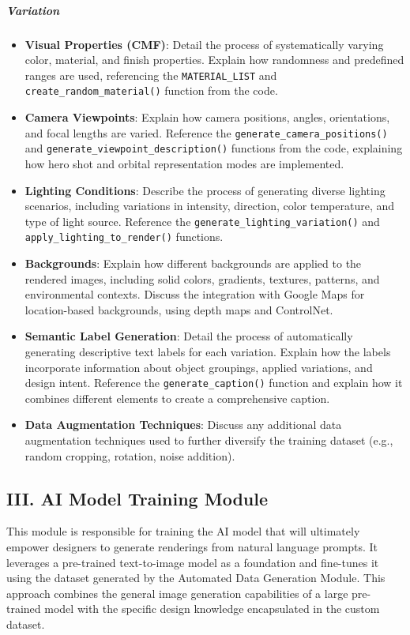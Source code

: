 \subparagraph{Variation}
\begin{itemize}
    \item \textbf{Visual Properties (CMF)}: Detail the process of systematically varying color, material, and finish properties. Explain how randomness and predefined ranges are used, referencing the \texttt{MATERIAL\_LIST} and \texttt{create\_random\_material()} function from the code.
    \item \textbf{Camera Viewpoints}: Explain how camera positions, angles, orientations, and focal lengths are varied. Reference the \texttt{generate\_camera\_positions()} and \texttt{generate\_viewpoint\_description()} functions from the code, explaining how hero shot and orbital representation modes are implemented.
    \item \textbf{Lighting Conditions}: Describe the process of generating diverse lighting scenarios, including variations in intensity, direction, color temperature, and type of light source. Reference the \texttt{generate\_lighting\_variation()} and \texttt{apply\_lighting\_to\_render()} functions.
    \item \textbf{Backgrounds}: Explain how different backgrounds are applied to the rendered images, including solid colors, gradients, textures, patterns, and environmental contexts. Discuss the integration with Google Maps for location-based backgrounds, using depth maps and ControlNet.
    \item \textbf{Semantic Label Generation}: Detail the process of automatically generating descriptive text labels for each variation. Explain how the labels incorporate information about object groupings, applied variations, and design intent. Reference the \texttt{generate\_caption()} function and explain how it combines different elements to create a comprehensive caption.
    \item \textbf{Data Augmentation Techniques}: Discuss any additional data augmentation techniques used to further diversify the training dataset (e.g., random cropping, rotation, noise addition).
\end{itemize}

\subsection{III. AI Model Training Module}

\patentParagraph
This module is responsible for training the AI model that will ultimately empower designers to generate renderings from natural language prompts. It leverages a pre-trained text-to-image model as a foundation and fine-tunes it using the dataset generated by the Automated Data Generation Module. This approach combines the general image generation capabilities of a large pre-trained model with the specific design knowledge encapsulated in the custom dataset.

